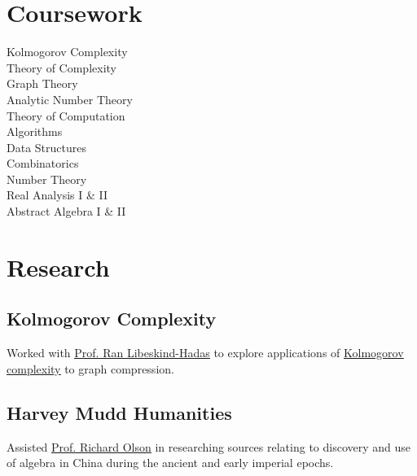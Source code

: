 \documentclass[]{jhearn-resume}
\begin{document}
\begin{minipage}[t]{0.34\textwidth}
\section{Coursework}
\small Kolmogorov Complexity\\
Theory of Complexity\\
Graph Theory\\
Analytic Number Theory\\
Theory of Computation \\
Algorithms \\
Data Structures \\
Combinatorics \\
Number Theory \\
Real Analysis I \& II \\
Abstract Algebra I \& II\\
\sectionsep
\vspace{-\topsep}
\section{Research}
\subsection{Kolmogorov Complexity}
\small Worked with 
{\href{https://www.cs.hmc.edu/~hadas/}{\color{blue1}\underline{Prof. Ran Libeskind-Hadas}}} 
to explore applications of 
{\href{https://en.wikipedia.org/wiki/Kolmogorov_complexity}{\color{blue1}\underline{Kolmogorov complexity}}} 
to graph compression.
\sectionsep 

\subsection{Harvey Mudd Humanities}
\small Assisted {\href{https://www.hmc.edu/hsa/hsa-faculty/emeritus-faculty/richard-olson/}{\color{blue1}\underline{Prof. Richard Olson}}} in researching sources relating to discovery and use of algebra in China during the ancient and early imperial epochs.
\sectionsep

\end{minipage}
\end{document}
